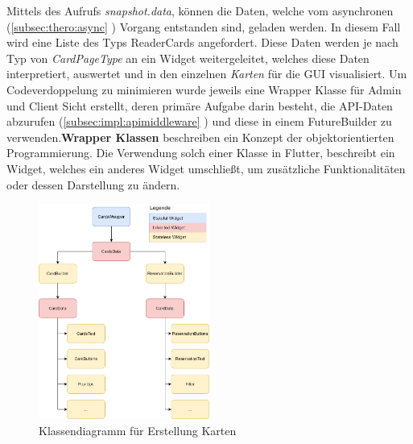     Mittels des Aufrufs {\textit{snapshot.data}}, können die Daten, welche vom asynchronen (\ref{subsec:thero:async} ) Vorgang entstanden sind, geladen werden. In diesem Fall wird eine Liste des Typs ReaderCards angefordert. Diese Daten werden je nach Typ von {\textit{CardPageType}} an ein Widget weitergeleitet, welches diese Daten interpretiert, auswertet und in den einzelnen {\textit{Karten}} f\"ur die GUI visualisiert. Um Codeverdoppelung zu minimieren wurde jeweils eine Wrapper Klasse für Admin und Client Sicht erstellt, deren primäre Aufgabe darin besteht, die API-Daten abzurufen (\ref{subsec:impl:apimiddleware} ) und diese in einem FutureBuilder zu verwenden.{\textbf{Wrapper Klassen}} beschreiben ein Konzept der objektorientierten Programmierung. Die Verwendung solch einer Klasse in Flutter, beschreibt ein Widget, welches ein anderes Widget umschließt, um zusätzliche Funktionalitäten oder dessen Darstellung zu ändern. 

\begin{figure}[h!]
\centering
\includegraphics[width=0.5\textwidth]{FLUTTER/images/GP/structure_inherited.png}
\caption{Klassendiagramm für Erstellung Karten}
\label{img:klassendiagrammkarten}
\end{figure}
\newpage
   

